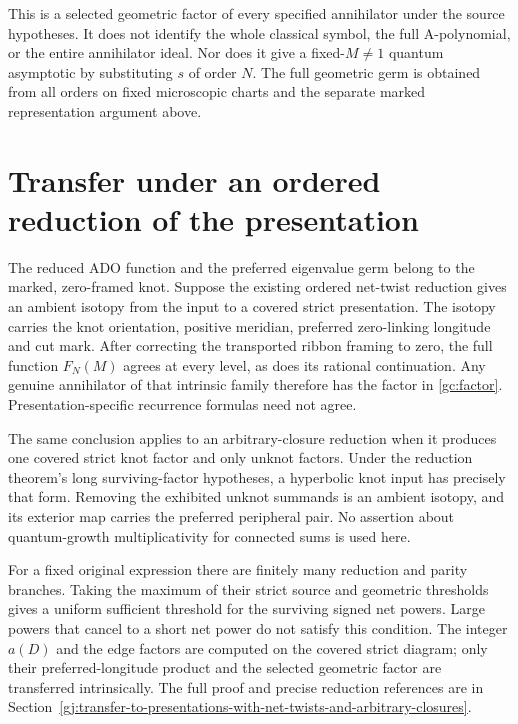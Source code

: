 This is a selected geometric factor of every specified annihilator
under the source hypotheses. It does not identify the whole
classical symbol, the full A-polynomial, or the entire annihilator
ideal. Nor does it give a fixed-$M\ne1$ quantum asymptotic by
substituting $s$ of order $N$. The full geometric germ is obtained
from all orders on fixed microscopic charts and the separate
marked representation argument above.

\section{Transfer under an ordered reduction of the presentation}
\label{gc:intrinsic-transfer}

The reduced ADO function and the preferred eigenvalue germ belong
to the marked, zero-framed knot. Suppose the existing ordered
net-twist reduction gives an ambient isotopy from the input to a
covered strict presentation. The isotopy carries the knot
orientation, positive meridian, preferred zero-linking longitude
and cut mark. After correcting the transported ribbon framing to
zero, the full function $F_N(M)$ agrees at every level, as does
its rational continuation. Any genuine annihilator of that
intrinsic family therefore has the factor in \eqref{gc:factor}.
Presentation-specific recurrence formulas need not agree.

The same conclusion applies to an arbitrary-closure reduction
when it produces one covered strict knot factor and only unknot
factors. Under the reduction theorem's long surviving-factor
hypotheses, a hyperbolic knot input has precisely that form.
Removing the exhibited unknot summands is an ambient isotopy,
and its exterior map carries the preferred peripheral pair.
No assertion about quantum-growth multiplicativity for connected
sums is used here.

For a fixed original expression there are finitely many reduction
and parity branches. Taking the maximum of their strict source
and geometric thresholds gives a uniform sufficient threshold
for the surviving signed net powers. Large powers that cancel
to a short net power do not satisfy this condition. The integer
$a(D)$ and the edge factors are computed on the covered strict
diagram; only their preferred-longitude product and the selected
geometric factor are transferred intrinsically. The full proof
and precise reduction references are in
Section~\ref{gj:transfer-to-presentations-with-net-twists-and-arbitrary-closures}.
